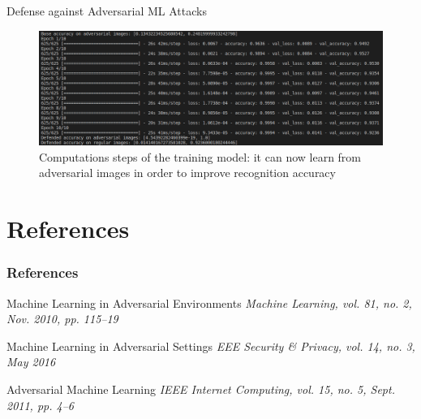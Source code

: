\documentclass[8pt]{beamer}
\begin{document}
\begin{frame}{Defense against Adversarial ML Attacks}
\begin{figure} 
    \includegraphics[scale=0.278]{images/immagini_matrix/defense_computation.png}
    \vspace*{-2mm}
    \caption{Computations steps of the training model: it can now learn from adversarial images in order to improve recognition accuracy}
\end{figure}
\end{frame}

\section{References}
\begin{frame}
\frametitle{References}
\begin{thebibliography}{99}
\newblock Machine Learning in Adversarial Environments
\newblock \emph{Machine Learning, vol. 81, no. 2, Nov. 2010, pp. 115–19}
\end{thebibliography}

\begin{thebibliography}{99}
\newblock Machine Learning in Adversarial Settings
\newblock \emph{EEE Security \& Privacy, vol. 14, no. 3, May 2016}
\end{thebibliography}

\begin{thebibliography}{99}
\newblock Adversarial Machine Learning
\newblock \emph{IEEE Internet Computing, vol. 15, no. 5, Sept. 2011, pp. 4–6}
\end{thebibliography}

\end{frame}
\end{document}
